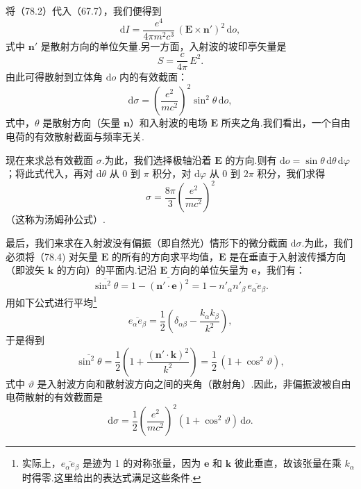 将（78.2）代入（67.7），我们便得到
\begin{equation}
  \mathrm{d}I=\frac{e^4}{4\pi m^2c^3}\,(\boldsymbol{E}\times\boldsymbol{n}')^2\,\mathrm{d}o,
\end{equation}
式中 $\boldsymbol{n}'$ 是散射方向的单位矢量.另一方面，入射波的坡印亭矢量是
\begin{equation*}
  S=\frac{c}{4\pi}\,E^2.
\end{equation*}
由此可得散射到立体角 $\mathrm{d}o$ 内的有效截面：
\begin{equation}
  \mathrm{d}\sigma=\left(\frac{e^2}{mc^2}\right)^{\!2}\sin^2\theta\,\mathrm{d}o,
\end{equation}
式中，$\theta$ 是散射方向（矢量 $\boldsymbol{n}$）和入射波的电场 $\boldsymbol{E}$ 所夹之角.我们看出，一个自由电荷的有效散射截面与频率无关.

现在来求总有效截面 $\sigma$.为此，我们选择极轴沿着 $\boldsymbol{E}$ 的方向.则有
$\mathrm{d}o=\sin\theta\,\mathrm{d}\theta\,\mathrm{d}\varphi$；将此式代入，再对 $\mathrm{d}\theta$ 从 0 到 $\pi$ 积分，对 $\mathrm{d}\varphi$ 从 0 到 $2\pi$ 积分，我们求得
\begin{equation}
  \sigma=\frac{8\pi}{3}\left(\frac{e^2}{mc^2}\right)^{\!2}
\end{equation}
（这称为汤姆孙公式）.

最后，我们来求在入射波没有偏振（即自然光）情形下的微分截面 $\mathrm{d}\sigma$.为此，我们必须将（78.4) 对矢量 $\boldsymbol{E}$ 的所有的方向求平均值，$\boldsymbol{E}$ 是在垂直于入射波传播方向（即波矢 $\boldsymbol{k}$ 的方向）的平面内.记沿 $\boldsymbol{E}$ 方向的单位矢量为 $\boldsymbol{e}$，我们有：
\begin{equation*}
  \overline{\sin^2\theta}=1-\overline{(\boldsymbol{n}'\cdot\boldsymbol{e})^2}
  =1-n'_{\alpha}n'_{\beta}\,\overline{e_{\alpha}e_{\beta}}.
\end{equation*}
用如下公式进行平均\footnote{实际上，$\overline{e_\alpha e_\beta}$ 是迹为 1 的对称张量，因为 $\boldsymbol{e}$ 和 $\boldsymbol{k}$ 彼此垂直，故该张量在乘 $k_\alpha$ 时得零.这里给出的表达式满足这些条件.}
\begin{equation}
  \overline{e_{\alpha}e_{\beta}}=\frac{1}{2}\left(\delta_{\alpha\beta}
  -\frac{k_{\alpha}k_{\beta}}{k^2}\right),
\end{equation}
于是得到
\begin{equation*}
  \overline{\sin^2\theta}=\frac{1}{2}\left(1+\frac{(\boldsymbol{n}'\cdot\boldsymbol{k})^2}{k^2}\right)
  =\frac{1}{2}\,(1+\cos^2\vartheta),
\end{equation*}
式中 $\vartheta$ 是入射波方向和散射波方向之间的夹角（散射角）.因此，非偏振波被自由电荷散射的有效截面是
\begin{equation}
  \mathrm{d}\sigma=\frac{1}{2}\left(\frac{e^2}{mc^2}\right)^{\!2}
  (1+\cos^2\vartheta)\,\mathrm{d}o.
\end{equation}


